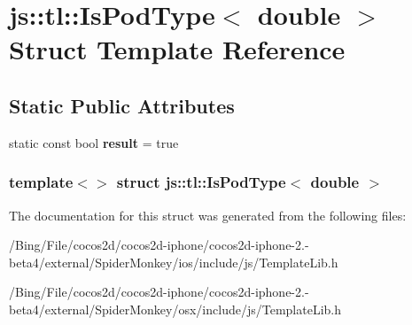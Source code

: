 \hypertarget{structjs_1_1tl_1_1_is_pod_type_3_01double_01_4}{\section{js\-:\-:tl\-:\-:Is\-Pod\-Type$<$ double $>$ Struct Template Reference}
\label{structjs_1_1tl_1_1_is_pod_type_3_01double_01_4}
}
\subsection*{Static Public Attributes}
\begin{DoxyCompactItemize}
\item 
\hypertarget{structjs_1_1tl_1_1_is_pod_type_3_01double_01_4_a5c9031d7a09621d180a2875e4911afea}{static const bool {\bfseries result} = true}\label{structjs_1_1tl_1_1_is_pod_type_3_01double_01_4_a5c9031d7a09621d180a2875e4911afea}

\end{DoxyCompactItemize}
\subsubsection*{template$<$$>$ struct js\-::tl\-::\-Is\-Pod\-Type$<$ double $>$}



The documentation for this struct was generated from the following files\-:\begin{DoxyCompactItemize}
\item 
/\-Bing/\-File/cocos2d/cocos2d-\/iphone/cocos2d-\/iphone-\/2.-\/beta4/external/\-Spider\-Monkey/ios/include/js/Template\-Lib.\-h\item 
/\-Bing/\-File/cocos2d/cocos2d-\/iphone/cocos2d-\/iphone-\/2.-\/beta4/external/\-Spider\-Monkey/osx/include/js/Template\-Lib.\-h\end{DoxyCompactItemize}
